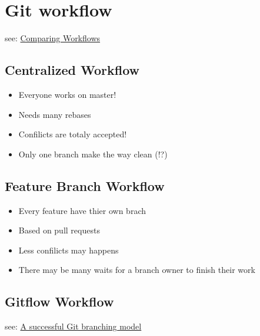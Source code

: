\documentclass[a4paper,10pt]{article}
\begin{document}
\section{Git workflow}\label{git-workflow}

see:
\href{https://www.atlassian.com/git/tutorials/comparing-workflows/}{Comparing
Workflows}

\subsection{Centralized Workflow}\label{centralized-workflow}

\begin{itemize}
\itemsep1pt\parskip0pt
\item
  Everyone works on master!
\item
  Needs many rebases
\item
  Confilicts are totaly accepted!
\item
  Only one branch make the way clean (!?)
\end{itemize}

\subsection{Feature Branch Workflow}\label{feature-branch-workflow}

\begin{itemize}
\itemsep1pt\parskip0pt
\item
  Every feature have thier own brach
\item
  Based on pull requests
\item
  Less confilicts may happens
\item
  There may be many waits for a branch owner to finish their work
\end{itemize}

\subsection{Gitflow Workflow}\label{gitflow-workflow}

see: \href{http://nvie.com/posts/a-successful-git-branching-model/}{A
successful Git branching model}
\end{document}

